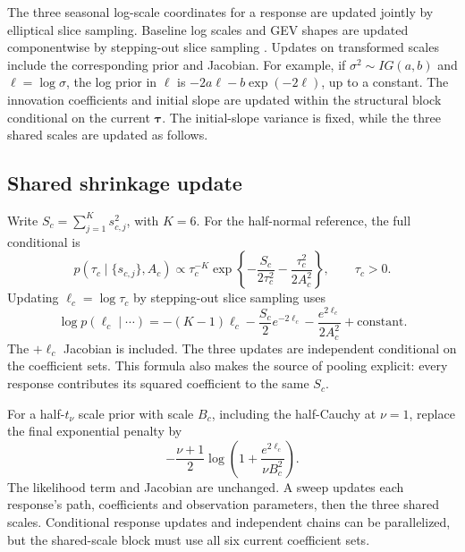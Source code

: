 \documentclass[11pt,a4paper]{article}
\begin{document}
	The three seasonal log-scale coordinates for a response are updated jointly
	by elliptical slice sampling. Baseline log scales and GEV shapes are
	updated componentwise by stepping-out slice sampling \citep{neal2003}. Updates on
	transformed scales include the corresponding prior and Jacobian. For
	example, if \(\sigma^2\sim IG(a,b)\) and \(\ell=\log\sigma\), the log
	prior in \(\ell\) is
	\(-2a\ell-b\exp(-2\ell)\), up to a constant. The innovation coefficients and initial slope are updated within the
structural block conditional on the current \(\bm\tau\). The initial-slope
variance is fixed, while the three shared scales are updated as follows.

\subsection{Shared shrinkage update}
\label{supp:shared-scale-update}

Write \(S_c=\sum_{j=1}^{K}s_{c,j}^2\), with \(K=6\). For the
half-normal reference, the full conditional is
\begin{equation}\label{eq:supp-shared-scale-conditional}
p(\tau_c\mid\{s_{c,j}\},A_c)
\propto\tau_c^{-K}
\exp\!\left\{-\frac{S_c}{2\tau_c^2}
             -\frac{\tau_c^2}{2A_c^2}\right\},\qquad\tau_c>0.
\end{equation}
Updating \(\ell_c=\log\tau_c\) by stepping-out slice sampling uses
\begin{equation}\label{eq:supp-shared-scale-logconditional}
\log p(\ell_c\mid\cdots)
=-(K-1)\ell_c-\frac{S_c}{2}e^{-2\ell_c}
-\frac{e^{2\ell_c}}{2A_c^2}+\text{constant}.
\end{equation}
The \(+\ell_c\) Jacobian is included. The three updates are independent
conditional on the coefficient sets. This formula also makes the source
of pooling explicit: every response contributes its squared coefficient
to the same \(S_c\).

For a half-\(t_\nu\) scale prior with scale \(B_c\), including the
half-Cauchy at \(\nu=1\), replace the final exponential penalty by
\[
-\frac{\nu+1}{2}\log\!\left(1+
\frac{e^{2\ell_c}}{\nu B_c^2}\right).
\]
The likelihood term and Jacobian are unchanged. A sweep updates each
response's path, coefficients and observation parameters, then the
three shared scales. Conditional response updates and independent
chains can be parallelized, but the shared-scale block must use all
six current coefficient sets.
	
	
	
	
	
\end{document}
